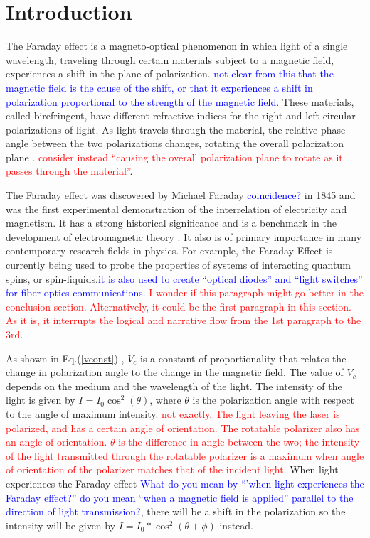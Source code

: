 \documentclass[prb,preprint]{revtex4-1}
\begin{document}
\section{Introduction} 

{The Faraday effect is a magneto-optical phenomenon in which light of a single wavelength, traveling through certain materials subject to a magnetic field, experiences a shift in the plane of polarization. \textcolor{blue}{not clear from this that the magnetic field is the cause of the shift, or that it experiences a shift in polarization proportional to the strength of the magnetic field}. These materials, called birefringent, have different refractive indices for the right and left circular polarizations of light. As light travels through the material, the relative phase angle between the two polarizations changes, rotating the overall polarization plane \cite{melissinos}.  \textcolor{red}{consider instead ``causing the overall polarization plane to rotate as it passes through the material''}. 

The Faraday effect was discovered by Michael Faraday \textcolor{blue}{coincidence?} in 1845 and was the first experimental demonstration of the interrelation of electricity and magnetism.  It has a strong historical significance and is a benchmark in the development of electromagnetic theory \cite{melissinos}.  It also is of primary importance in many contemporary research fields in physics.  For example, the Faraday Effect is currently being used to probe the properties of systems of interacting quantum spins, or spin-liquids.\cite{spin}\textcolor{blue}{it is also used to create ``optical diodes'' and ``light switches'' for fiber-optics communications.} \textcolor{red}{I wonder if this paragraph might go better in the conclusion section. Alternatively, it could be the first paragraph in this section. As it is, it interrupts the logical and narrative flow from the 1st paragraph to the 3rd.}


As shown in Eq.(\ref{vconst}) , $V_{c}$ is a constant of proportionality that relates the change in polarization angle to the change in the magnetic field.\cite{expphysics} The value of $V_{c}$ depends on the medium and the wavelength of the light. The intensity of the light is given by $I=I_{0}\cos^{2}(\theta)$, where $\theta$ is the polarization angle with respect to the angle of  maximum intensity. \textcolor{red}{not exactly. The light leaving the laser is polarized, and has a certain angle of orientation. The rotatable polarizer also has an angle of orientation. $\theta$ is the difference in angle between the two; the intensity of the light transmitted through the rotatable polarizer is a maximum when angle of orientation of the polarizer matches that of the incident light.} When light experiences the Faraday effect \textcolor{blue}{What do you mean by ``'when light experiences the Faraday effect?'' do you mean ``when a magnetic field is applied'' parallel to the direction of light transmission?}, there will be a shift in the polarization so the intensity will be given by $I=I_{0}*\cos^{2}(\theta+\phi)$ instead.
}
\end{document}
